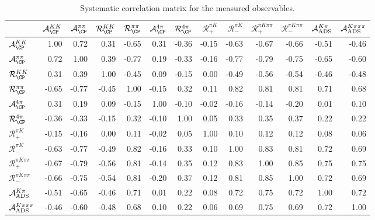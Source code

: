 \begin{table}
\centering
\footnotesize
\caption{Systematic correlation matrix for the measured observables.}
\begin{tabular}{l|rrrrrrrrrrrr}
& $\mathcal{A}_{\CP}^{KK}$& $\mathcal{A}_{\CP}^{\pi\pi}$& $\mathcal{R}_{\CP}^{KK}$& $\mathcal{R}_{\CP}^{\pi\pi}$& $\mathcal{A}_{\CP}^{4\pi}$& $\mathcal{R}_{\CP}^{4\pi}$& $\mathcal{R}_+^{\pi K}$& $\mathcal{R}_-^{\pi K}$& $\mathcal{R}_+^{\pi K\pi\pi}$& $\mathcal{R}_-^{\pi K\pi\pi}$& $\mathcal{A}_{\rm ADS}^{K\pi}$& $\mathcal{A}_{\rm ADS}^{K\pi\pi\pi}$ \\
\midrule

$\mathcal{A}_{\CP}^{KK}$& 1.00& 0.72& 0.31& -0.65& 0.31& -0.36& -0.15& -0.63& -0.67& -0.66& -0.51& -0.46 \\

$\mathcal{A}_{\CP}^{\pi\pi}$& 0.72& 1.00& 0.39& -0.77& 0.19& -0.33& -0.16& -0.77& -0.79& -0.75& -0.65& -0.60 \\

$\mathcal{R}_{\CP}^{KK}$& 0.31& 0.39& 1.00& -0.45& 0.09& -0.15& 0.00& -0.49& -0.56& -0.54& -0.46& -0.48 \\

$\mathcal{R}_{\CP}^{\pi\pi}$& -0.65& -0.77& -0.45& 1.00& -0.15& 0.32& 0.11& 0.82& 0.81& 0.81& 0.71& 0.68 \\

$\mathcal{A}_{\CP}^{4\pi}$& 0.31& 0.19& 0.09& -0.15& 1.00& -0.10& -0.02& -0.16& -0.14& -0.20& 0.01& 0.10 \\

$\mathcal{R}_{\CP}^{4\pi}$& -0.36& -0.33& -0.15& 0.32& -0.10& 1.00& 0.05& 0.33& 0.35& 0.37& 0.22& 0.22 \\

$\mathcal{R}_+^{\pi K}$& -0.15& -0.16& 0.00& 0.11& -0.02& 0.05& 1.00& 0.10& 0.12& 0.12& 0.08& 0.06 \\

$\mathcal{R}_-^{\pi K}$& -0.63& -0.77& -0.49& 0.82& -0.16& 0.33& 0.10& 1.00& 0.83& 0.81& 0.72& 0.69 \\

$\mathcal{R}_+^{\pi K\pi\pi}$& -0.67& -0.79& -0.56& 0.81& -0.14& 0.35& 0.12& 0.83& 1.00& 0.85& 0.75& 0.75 \\

$\mathcal{R}_-^{\pi K\pi\pi}$& -0.66& -0.75& -0.54& 0.81& -0.20& 0.37& 0.12& 0.81& 0.85& 1.00& 0.72& 0.69 \\

$\mathcal{A}_{\rm ADS}^{K\pi}$& -0.51& -0.65& -0.46& 0.71& 0.01& 0.22& 0.08& 0.72& 0.75& 0.72& 1.00& 0.72 \\

$\mathcal{A}_{\rm ADS}^{K\pi\pi\pi}$& -0.46& -0.60& -0.48& 0.68& 0.10& 0.22& 0.06& 0.69& 0.75& 0.69& 0.72& 1.00 \\
\end{tabular}
\end{table}
